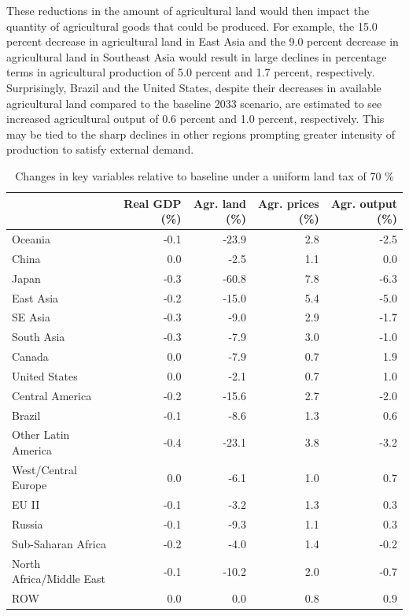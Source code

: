 \documentclass[
]{article}
\begin{document}
These reductions in the amount of agricultural land would then impact the quantity of agricultural goods that could be produced. For example, the 15.0 percent decrease in agricultural land in East Asia and the 9.0 percent decrease in agricultural land in Southeast Asia would result in large declines in percentage terms in agricultural production of 5.0 percent and 1.7 percent, respectively. Surprisingly, Brazil and the United States, despite their decreases in available agricultural land compared to the baseline 2033 scenario, are estimated to see increased agricultural output of 0.6 percent and 1.0 percent, respectively. This may be tied to the sharp declines in other regions prompting greater intensity of production to satisfy external demand.

\begin{table}
\centering
\caption{\label{tab:baseline-scenario1}Changes in key variables relative to baseline under a uniform land tax of 70 \%}
\centering
\begin{tabular}[t]{|>{}l|r|r|r|>{}r|}
\hline
  & Real GDP (\%) & Agr. land (\%) & Agr. prices (\%) & Agr. output (\%)\\
\hline
Oceania & -0.1 & -23.9 & 2.8 & -2.5\\
\hline
China & 0.0 & -2.5 & 1.1 & 0.0\\
\hline
Japan & -0.3 & -60.8 & 7.8 & -6.3\\
\hline
East Asia & -0.2 & -15.0 & 5.4 & -5.0\\
\hline
SE Asia & -0.3 & -9.0 & 2.9 & -1.7\\
\hline
South Asia & -0.3 & -7.9 & 3.0 & -1.0\\
\hline
Canada & 0.0 & -7.9 & 0.7 & 1.9\\
\hline
United States & 0.0 & -2.1 & 0.7 & 1.0\\
\hline
Central America & -0.2 & -15.6 & 2.7 & -2.0\\
\hline
Brazil & -0.1 & -8.6 & 1.3 & 0.6\\
\hline
Other Latin America & -0.4 & -23.1 & 3.8 & -3.2\\
\hline
West/Central Europe & 0.0 & -6.1 & 1.0 & 0.7\\
\hline
EU II & -0.1 & -3.2 & 1.3 & 0.3\\
\hline
Russia & -0.1 & -9.3 & 1.1 & 0.3\\
\hline
Sub-Saharan Africa & -0.2 & -4.0 & 1.4 & -0.2\\
\hline
North Africa/Middle East & -0.1 & -10.2 & 2.0 & -0.7\\
\hline
ROW & 0.0 & 0.0 & 0.8 & 0.9\\
\hline
\end{tabular}
\end{table}
\end{document}

